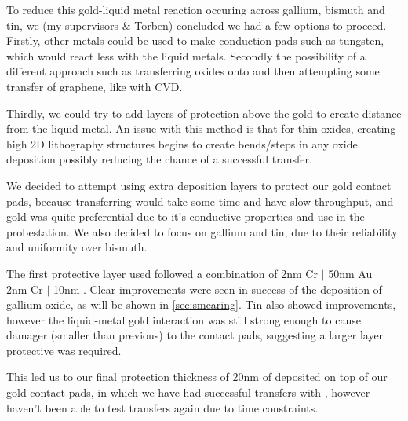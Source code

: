 \documentclass[../Matt_Gebert_Honours_Thesis.tex]{subfiles}
\begin{document}
	To reduce this gold-liquid metal reaction occuring across gallium, bismuth and tin, we (my supervisors \& Torben) concluded we had a few options to proceed. Firstly, other metals could be used to make conduction pads such as tungsten, which would react less with the liquid metals. Secondly the possibility of a different approach such as transferring oxides onto \silicondioxide{} and then attempting some transfer of graphene, like with CVD. 
	
	Thirdly, we could try to add layers of protection above the gold to create distance from the liquid metal. An issue with this method is that for thin oxides, creating high 2D lithography structures begins to create bends/steps in any oxide deposition possibly reducing the chance of a successful transfer.
	
	We decided to attempt using extra deposition layers to protect our gold contact pads, because transferring would take some time and have slow throughput, and gold was quite preferential due to it's conductive properties and use in the probestation. We also decided to focus on gallium and tin, due to their reliability and uniformity over bismuth.
	
	The first protective layer used followed a combination of 2nm Cr $\vert$ 50nm Au $\vert$ 2nm Cr $\vert$ 10nm \silicondioxide{}. Clear improvements were seen in success of the deposition of gallium oxide, as will be shown in \cref{sec:smearing}. Tin also showed improvements, however the liquid-metal gold interaction was still strong enough to cause damager (smaller than previous) to the contact pads, suggesting a larger layer protective \silicondioxide{} was required.
	
	This led us to our final protection thickness of 20nm of \silicondioxide{} deposited on top of our gold contact pads, in which we have had successful transfers with \galliumoxide{}, however haven't been able to test \tinoxide{} transfers again due to time constraints.
	
\end{document}
